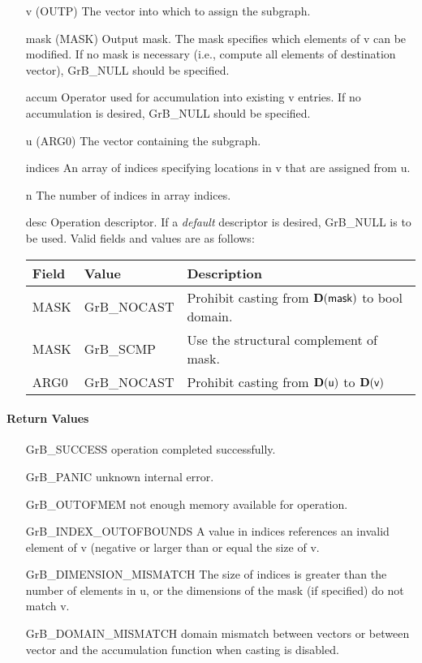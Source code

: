 \begin{itemize}[leftmargin=1.1in]
    \item[{\sf v}]   ({\sf OUTP}) The vector into which to assign the subgraph.
    \item[{\sf mask}] ({\sf MASK}) Output mask. The mask specifies which elements
    of {\sf v} can be modified. If no mask is necessary (i.e., compute all
    elements of destination vector), {\sf GrB\_NULL} should be specified.
    \item[{\sf accum}] Operator used for accumulation into existing {\sf v} entries.  If no accumulation
                        is desired, {\sf GrB\_NULL} should be specified.
    \item[{\sf u}]   ({\sf ARG0}) The vector containing the subgraph.
    \item[{\sf indices}]   An array of indices specifying locations in {\sf v} that
                          are assigned from {\sf u}.
    \item[{\sf n}]        The number of indices in array {\sf indices}.
    \item[{\sf desc}]   Operation descriptor. If a
    \emph{default} descriptor is desired, {\sf GrB\_NULL} is to be
    used. Valid fields and values are as follows: \\
    \begin{tabular}{lll}
    Field  & Value & Description \\
    \hline
    {\sf MASK} & {\sf GrB\_NOCAST} & Prohibit casting from $\bold{D}({\sf mask})$ to {\sf bool} domain. \\
    {\sf MASK} & {\sf GrB\_SCMP} & Use the structural complement of {\sf mask}. \\
    {\sf ARG0} & {\sf GrB\_NOCAST} & Prohibit casting from $\bold{D}({\sf u})$ to $\bold{D}({\sf v})$ \\
    \end{tabular}
\end{itemize}

\paragraph{Return Values}

\begin{itemize}[leftmargin=2.1in]
\item[{\sf GrB\_SUCCESS}]      operation completed successfully.
\item[{\sf GrB\_PANIC}]        unknown internal error.
\item[{\sf GrB\_OUTOFMEM}]     not enough memory available for operation.
\item[{\sf GrB\_INDEX\_OUTOFBOUNDS}]
        A value in {\sf indices} references an invalid element of {\sf v} (negative or larger than or equal the size of {\sf v}.
\item[{\sf GrB\_DIMENSION\_MISMATCH}] 
        The size of {\sf indices} is greater than the number of elements in {\sf u}, or
        the dimensions of the mask (if specified) do not match {\sf v}.
\item[\sf GrB\_DOMAIN\_MISMATCH]  
       domain mismatch between vectors or between vector and the accumulation function when casting is disabled.
\end{itemize}

